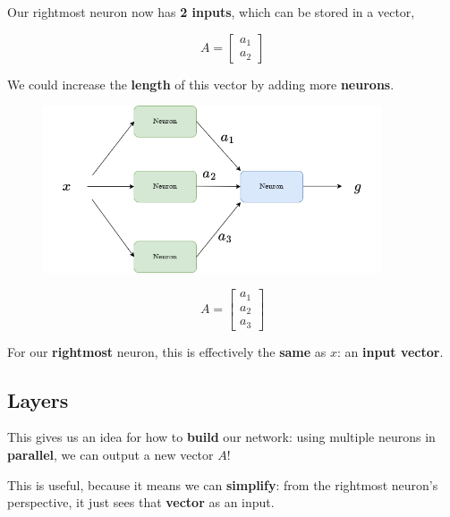         Our rightmost neuron now has \textbf{2 inputs}, which can be stored in a vector,
        
        \begin{equation}
            A = 
            \begin{bmatrix}
              a_1 \\ a_2
            \end{bmatrix}
        \end{equation}
        
        We could increase the \textbf{length} of this vector by adding more \textbf{neurons}.
        
        \begin{figure}[H]
            \centering
            \includegraphics[width=100mm,scale=0.4]{images/nn_images/three_parallel.png}
        \end{figure}
        
        \begin{equation}
            A = \begin{bmatrix}
              a_1 \\ a_2 \\ a_3
            \end{bmatrix}
        \end{equation}
        
        For our \textbf{rightmost} neuron, this is effectively the \textbf{same} as $x$: an \textbf{input vector}. 
        
    \subsection{Layers}
        
        This gives us an idea for how to \textbf{build} our network: using multiple neurons in \textbf{parallel}, we can output a new vector $A$! 
        
        This is useful, because it means we can \textbf{simplify}: from the rightmost neuron's perspective, it just sees that \textbf{vector} as an input.
        
